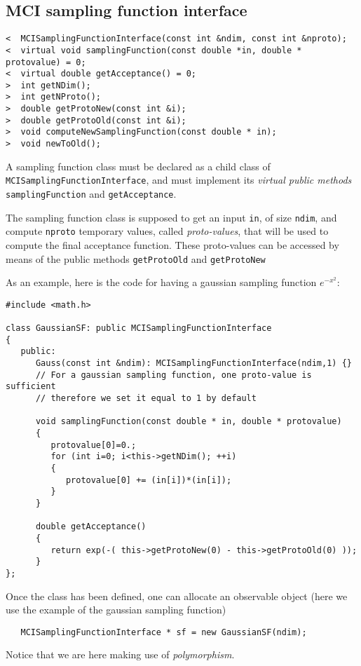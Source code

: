 \documentclass[11pt,a4paper,twoside]{article}
\begin{document}
\subsection{MCI sampling function interface} %
\label{sub:mci_sampling_function_interface}

\begin{verbatim}
<  MCISamplingFunctionInterface(const int &ndim, const int &nproto);
<  virtual void samplingFunction(const double *in, double * protovalue) = 0;
<  virtual double getAcceptance() = 0;
>  int getNDim();
>  int getNProto();
>  double getProtoNew(const int &i);
>  double getProtoOld(const int &i);
>  void computeNewSamplingFunction(const double * in);
>  void newToOld();
\end{verbatim}

A sampling function class must be declared as a child class of \verb+MCISamplingFunctionInterface+, and must implement its \emph{virtual public methods} \verb+samplingFunction+ and \verb+getAcceptance+.

The sampling function class is supposed to get an input \verb+in+, of size \verb+ndim+, and compute \verb+nproto+ temporary values, called \emph{proto-values}, that will be used to compute the final acceptance function.
These proto-values can be accessed by means of the public methods \verb+getProtoOld+ and \verb+getProtoNew+

As an example, here is the code for having a gaussian sampling function $e^{-x^2}$:
\begin{verbatim}
#include <math.h>
   
class GaussianSF: public MCISamplingFunctionInterface
{
   public:
      Gauss(const int &ndim): MCISamplingFunctionInterface(ndim,1) {}
      // For a gaussian sampling function, one proto-value is sufficient
      // therefore we set it equal to 1 by default
      
      void samplingFunction(const double * in, double * protovalue)
      {
         protovalue[0]=0.;
         for (int i=0; i<this->getNDim(); ++i)
         {
            protovalue[0] += (in[i])*(in[i]);
         }
      }
   
      double getAcceptance()
      {
         return exp(-( this->getProtoNew(0) - this->getProtoOld(0) ));
      }
};
\end{verbatim}

Once the class has been defined, one can allocate an observable object (here we use the example of the gaussian sampling function)
\begin{verbatim}
   MCISamplingFunctionInterface * sf = new GaussianSF(ndim);
\end{verbatim}
Notice that we are here making use of \emph{polymorphism}.
\end{document}
